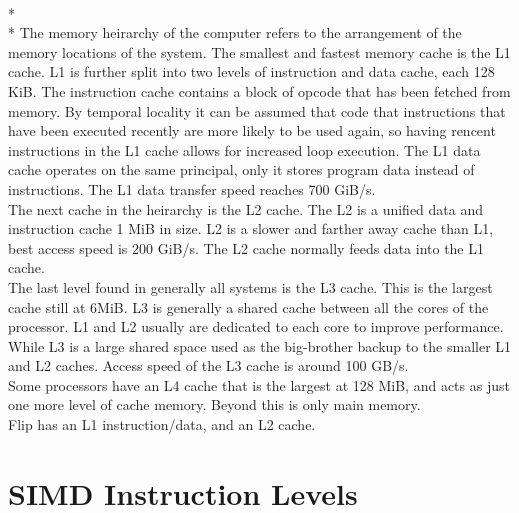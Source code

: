 \documentclass[letterpaper,10pt,titlepage]{article}
\begin{document}
    \\*
    \\*
    The memory heirarchy of the computer refers to the arrangement of the memory locations 
    of the system. The smallest and fastest memory cache is the L1 cache. L1 is further split 
    into two levels of instruction and data cache, each 128 KiB. The instruction cache contains a block 
    of opcode that has been fetched from memory. By temporal locality it can be assumed that code
    that instructions that have been executed recently are more likely to be used again, so having 
    rencent instructions in the L1 cache allows for increased loop execution. The L1 data cache operates
    on the same principal, only it stores program data instead of instructions. The L1 data transfer speed
    reaches 700 GiB/s. 
    \\
    The next cache in the heirarchy is the L2 cache. The L2 is a unified data and instruction cache 1 MiB 
    in size. L2 is a slower and farther away cache than L1, best access speed is 200 GiB/s. The L2 cache 
    normally feeds data into the L1 cache. 
    \\
    The last level found in generally all systems is the L3 cache. This is the largest cache still at 6MiB. 
    L3 is generally a shared cache between all the cores of the processor. L1 and L2 usually are dedicated to each 
    core to improve performance. While L3 is a large shared space used as the big-brother backup to the smaller
    L1 and L2 caches. Access speed of the L3 cache is around 100 GB/s. 
    \\
    Some processors have an L4 cache that is the largest at 128 MiB, and acts as just one more level of cache 
    memory. Beyond this is only main memory.
    \\
    Flip has an L1 instruction/data, and an L2 cache.
\pagebreak

\section{SIMD Instruction Levels}

    
\end{document}
